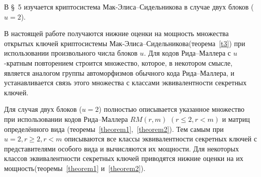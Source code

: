 В \S~5 изучается криптосистема Мак-Элиса--Сидельникова в случае
двух блоков ($u=2$).

В настоящей работе получаются нижние оценки на мощность множества
открытых ключей криптосистемы
Мак-Элиса--Сидельникова(теорема~\ref{t3}) при использовании
произвольного числа блоков $u$. Для кодов Рида--Маллера с
$u$-кратным повторением строится множество, которое, в некотором
смысле, является аналогом группы автоморфизмов обычного кода
Рида--Маллера, и устанавливается связь этого множества с классами
эквивалентности секретных ключей.

Для случая двух блоков ($u=2$) полностью описывается указанное
множество при использовании кодов Рида--Маллера $RM(r,m)$
$(r\leqslant 2,r<m)$ и матриц определённого вида
(теоремы~\ref{theorem1},~\ref{theorem2}). Тем самым при $u=2,
r\geqslant 2, r<m$ описываются все классы эквивалентности
секретных ключей с представителями особого вида и вычисляются их
мощности. Для некоторых классов эквивалентности секретных ключей
приводятся нижние оценки на их мощность(теоремы~\ref{theorem1}
и~\ref{theorem2}).
